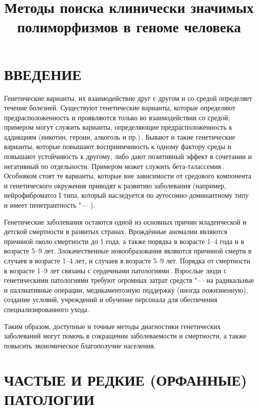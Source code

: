 \documentclass[12pt, twoside, a4paper]{article}
\title{Методы поиска клинически значимых полиморфизмов в геноме человека}
\begin{document}

\maketitle

\section*{ВВЕДЕНИЕ}

Генетические варианты, их взаимодействие друг с другом и со средой определяет течение болезней.
Существуют генетические варианты, которые определяют предрасположенность и проявляются только во взаимодействии со средой; примером могут служить варианты, определяющие предрасположенность к аддикциям (никотин, героин, алкоголь и пр.)\,\cite{Hiroi_2004}.
Бывают и такие генетические варианты, которые повышают восприимчивость к одному фактору среды и повышают устойчивость к другому, либо дают позитивный эффект в сочетании и негативный по отдельности.
Примером может служить бета-талассемия\,\cite{Galanello_2010}.
Особняком стоят те варианты, которые вне зависимости от средового компонента и генетического окружения приводят к развитию заболевания (например, нейрофиброматоз I типа, который наследуется по аутосомно-доминантному типу и имеет  пенетрантность "--- \citealp{Jett_2009}).

Генетические заболевания остаются одной из основных причин младенческой и детской смертности в развитых странах.
Врождённые аномалии являются причиной около  смертности до 1 года, а также порядка  в возрасте 1--4 года и  в возрасте 5--9 лет.
Злокачественные новообразования являются причиной смерти в  случаев в возрасте 1--4 лет, и  случаев в возрасте 5--9 лет.
Порядка  от смертности в возрасте 1--9 лет связаны с сердечными патологиями\,\cite{Field_2003}.
Взрослые люди с генетическими патологиями требуют огромных затрат средств "--- на радикальные и паллиативные операции, медикаментозную поддержку (иногда пожизненную), создание условий, учреждений и обучение персонала для обеспечения специализированного ухода.

Таким образом, доступные и точные методы диагностики генетических заболеваний могут помочь в сокращении заболеваемости и смертности, а также повысить экономическое благополучие населения.

\section*{ЧАСТЫЕ И РЕДКИЕ (ОРФАННЫЕ) ПАТОЛОГИИ}
\end{document}
